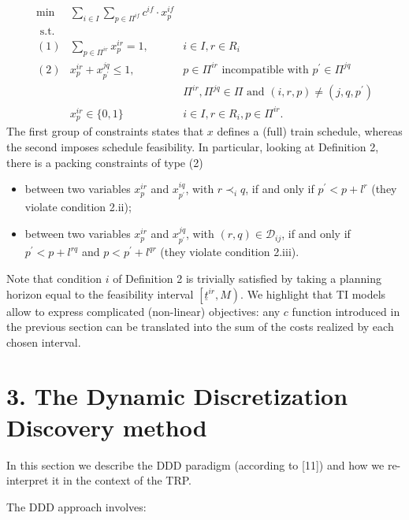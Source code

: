 \documentclass[10pt]{article}
\begin{document}
\[
\begin{array}{lll}
\min & \sum_{i \in I} \sum_{p \in \Pi^{i f}} c^{i f} \cdot x_{p}^{i f} & \\
\text { s.t. } & & \\
(1) & \sum_{p \in \Pi^{i r}} x_{p}^{i r}=1, & i \in I, r \in R_{i}  \tag{TI}\\
(2) & x_{p}^{i r}+x_{p^{\prime}}^{j q} \leq 1, & p \in \Pi^{i r} \text { incompatible with } p^{\prime} \in \Pi^{j q} \\
& & \Pi^{i r}, \Pi^{j q} \in \Pi \text { and }(i, r, p) \neq\left(j, q, p^{\prime}\right) \\
& x_{p}^{i r} \in\{0,1\} & i \in I, r \in R_{i}, p \in \Pi^{i r} .
\end{array}
\]
\captionsetup{singlelinecheck=false}
The first group of constraints states that $x$ defines a (full) train schedule, whereas the second imposes schedule feasibility. In particular, looking at Definition 2, there is a packing constraints of type (2)

    \begin{itemize}
      \item between two variables $x_{p}^{i r}$ and $x_{p^{\prime}}^{i q}$, with $r \prec_{i} q$, if and only if $p^{\prime}<p+l^{r}$ (they violate condition 2.ii);
      \item between two variables $x_{p}^{i r}$ and $x_{p^{\prime}}^{j q}$, with $(r, q) \in \mathcal{D}_{i j}$, if and only if $p^{\prime}<p+l^{r q}$ and $p<p^{\prime}+l^{q r}$ (they violate condition 2.iii).
    \end{itemize}
Note that condition $i$ of Definition 2 is trivially satisfied by taking a planning horizon equal to the feasibility interval $\left[\underline{t}^{i r}, M\right)$. We highlight that TI models allow to express complicated (non-linear) objectives: any $c$ function introduced in the previous section can be translated into the sum of the costs realized by each chosen interval.

\section*{3. The Dynamic Discretization Discovery method}
In this section we describe the DDD paradigm (according to [11]) and how we re-interpret it in the context of the TRP.

The DDD approach involves:
\end{document}
